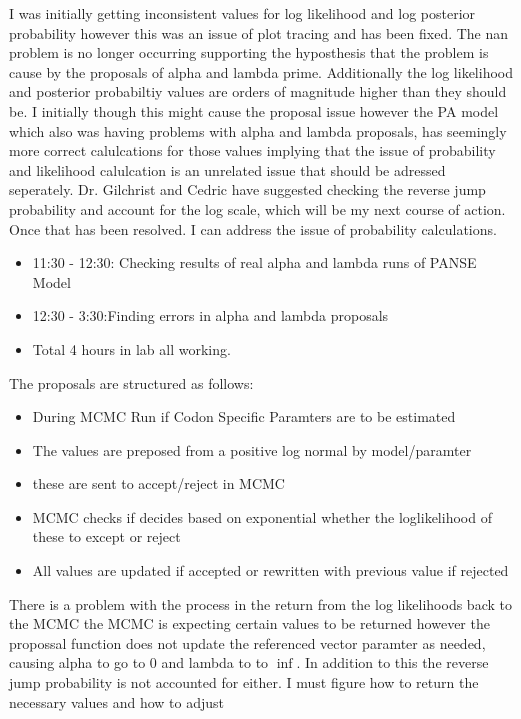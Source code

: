 \documentclass[12pt,hyperref]{labbook}
\begin{document}
I was initially getting inconsistent values for log likelihood and log posterior probability however this was an issue of plot tracing and has been fixed. The nan problem is no longer occurring supporting the hyposthesis that the problem is cause by the proposals of alpha and lambda prime.
Additionally the log likelihood and posterior probabiltiy values are orders of magnitude higher than they should be. I initially though this might cause the proposal issue however the PA model which also was having problems with alpha and lambda proposals, has seemingly more correct calulcations for those values implying that the issue of probability and likelihood calulcation is an unrelated issue that should be adressed seperately.
Dr. Gilchrist and Cedric have suggested checking the reverse jump probability and account for the log scale, which will be my next course of action. Once that has been resolved. I can address the issue of probability calculations.
\begin{itemize}
    \item 11:30 - 12:30: Checking results of real alpha and lambda runs of PANSE Model
    \item 12:30 - 3:30:Finding errors in alpha and lambda proposals
    \item Total 4 hours in lab all working.
\end{itemize}
The proposals are structured as follows:
\begin{itemize}
    \item During MCMC Run if Codon Specific Paramters are to be estimated
    \item The values are preposed from a positive log normal by model/paramter
    \item these are sent to accept/reject in MCMC
    \item MCMC checks if decides based on exponential whether the loglikelihood of these to except or reject
    \item All values are updated if accepted or rewritten with previous value if rejected
\end{itemize}
There is a problem with the process in the return from the log likelihoods back to the MCMC the MCMC is expecting certain values to be returned
however the propossal function does not update the referenced vector paramter as needed, causing alpha to go to 0 and lambda to to $\inf$. In addition to this the reverse jump probability is not accounted for either. I must figure how to return the necessary values and how to adjust
\end{document}
